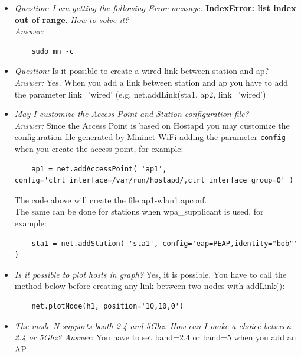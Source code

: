 \begin{itemize}
\item \textit{Question:} \textit{I am getting the following Error message:} \textbf{IndexError: list index out of range}. \textit{How to solve it?}\\
\textit{Answer:}
\begin{verbatim}
    sudo mn -c
\end{verbatim}
\item \textit{Question:} Is it possible to create a wired link between station and ap?\\
\textit{Answer:} Yes. When you add a link between station and ap you have to add the parameter link='wired' (e.g. net.addLink(sta1, ap2, link='wired')\\

\item \textit{May I customize the Access Point and Station configuration file?}
\\
\textit{Answer:} Since the Access Point is based on Hostapd you may customize the configuration file generated by Mininet-WiFi adding the parameter \texttt{config} when you create the access point, for example:\\

\begin{verbatim}
    ap1 = net.addAccessPoint( 'ap1', config='ctrl_interface=/var/run/hostapd/,ctrl_interface_group=0' )
\end{verbatim}

The code above will create the file ap1-wlan1.apconf. \\

The same can be done for stations when wpa\_supplicant is used, for example:

\begin{verbatim}
    sta1 = net.addStation( 'sta1', config='eap=PEAP,identity="bob"' )
\end{verbatim}


\item \textit{Is it possible to plot hosts in graph?}
Yes, it is possible. You have to call the method below before creating any link between two nodes with addLink():

\begin{verbatim}
    net.plotNode(h1, position='10,10,0')
\end{verbatim}

\item \textit{The mode N supports booth 2.4 and 5Ghz. How can I make a choice between 2.4 or 5Ghz?}
\textit{Answer}: You have to set band=2.4 or band=5 when you add an AP.
\end{itemize}